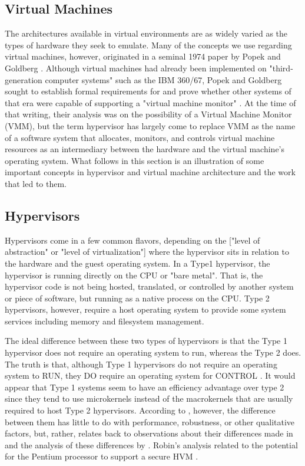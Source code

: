 \subsection{Virtual Machines}
\label{sec:virtual_machines}
The architectures available in virtual environments are as widely varied as the types 
of hardware they seek to emulate.  Many of the concepts we use regarding virtual machines,
however, originated in a seminal 1974 paper by Popek and Goldberg \autocite{_popek_1}.  Although 
virtual machines had already been implemented on "third-generation computer systems" 
such as the IBM 360/67, Popek and Goldberg sought to establish formal requirements 
for and prove whether other systems of that era were capable of supporting a 
"virtual machine monitor" \autocite{_popek_1}.  At the time of that writing, their analysis 
was on the possibility of a Virtual Machine Monitor (VMM), but the term hypervisor
has largely come to replace VMM as the name of a software system that allocates,
monitors, and controls virtual machine resources as an intermediary between the hardware
and the virtual machine's operating system.  What follows in this section is an 
illustration of some important concepts in hypervisor and virtual machine architecture
and the work that led to them.

\subsection{Hypervisors}
\label{sec:hypervisors}
Hypervisors come in a few common flavors, depending on the ["level of abstraction" or "level of virtualization"] 
where the hypervisor sits in relation to the hardware and the guest operating system.
In a Type1 hypervisor, the hypervisor is running directly on the CPU or "bare metal".
That is, the hypervisor code is not being hosted, translated, or controlled by another
system or piece of software, but running as a native process on the CPU.  Type 2
hypervisors, however, require a host operating system to provide some system services
including memory and filesystem management.

The ideal difference between these two types of hypervisors is that the Type 1 hypervisor does not require an operating system to run, whereas the Type 2 does.  The truth is that, although Type 1 hypervisors do not require an operating system to RUN, they DO require an operating system for CONTROL \autocite{_liguori_1}.  It would appear that Type 1 systems seem to have an efficiency advantage over type 2 since they tend to use microkernels instead of the macrokernels that are usually required to host Type 2 hypervisors.  According to \autocite{_liguori_1}, however, the difference between them has little to do with performance, robustness, or other qualitative factors, but, rather, relates back to  observations about their differences made in \autocite{_popek_1} and the analysis of these differences by \autocite{_robin_1}.  Robin's analysis related to the potential for the Pentium processor to support a secure HVM \autocite{_robin_1}.  

